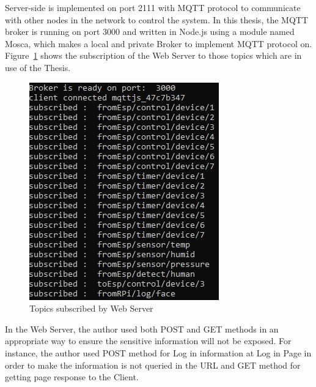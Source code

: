         Server-side is implemented on port 2111 with MQTT protocol to communicate with other nodes in the network to control the system. In this thesis, the MQTT broker is running on port 3000 and written in Node.js using a module named Mosca, which makes a local and private Broker to implement MQTT protocol on. Figure~\ref{fig:webSub} shows the subscription of the Web Server to those topics which are in use of the Thesis.
        \begin{figure}[!htb]
            \begin{center}
            \includegraphics[scale=1]{images/webSub.png}
            \caption{Topics subscribed by Web Server}
            \label{fig:webSub}
            \end{center}
        \end{figure}

        In the Web Server, the author used both POST and GET methods in an appropriate way to ensure the sensitive information will not be exposed. For instance, the author used POST method for Log in information at Log in Page in order to make the information is not queried in the URL and GET method for getting page response to the Client.

